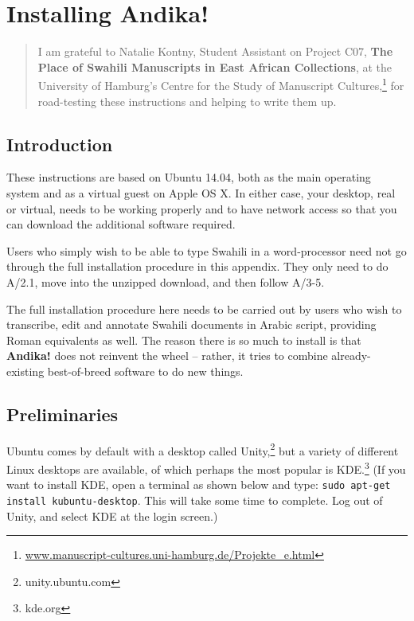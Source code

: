 \chapter{Installing \textbf{Andika!}}
\renewcommand{\thesection}{A/\arabic{section}}  %
\setcounter{section}{0}  %
\label{appA}


\begin{quotation}
\noindent I am grateful to Natalie Kontny, Student Assistant on Project C07, \textbf{The Place of Swahili Manuscripts in East African Collections},  at the University of Hamburg's Centre for the Study of Manuscript Cultures,\footnote{\url{www.manuscript-cultures.uni-hamburg.de/Projekte_e.html}} for road-testing these instructions and helping to write them up.
\end{quotation}

\section{Introduction}

These instructions are based on Ubuntu 14.04, both as the main operating system and as a virtual guest on Apple OS X. In either case, your desktop, real or virtual, needs to be working properly and to have network access so that you can download the additional software required.

Users who simply wish to be able to type Swahili in a word-processor need not go through the full installation procedure in this appendix.  They only need to do A/2.1, move into the unzipped download, and then follow A/3-5.

The full installation procedure here needs to be carried out by users who wish to transcribe, edit and annotate Swahili documents in Arabic script, providing Roman equivalents as well.  The reason there is so much to install is that \textbf{Andika!} does not reinvent the wheel -- rather, it tries to combine already-existing best-of-breed software to do new things.

\section{Preliminaries}

Ubuntu comes by default with a desktop called Unity,\footnote{unity.ubuntu.com} but a variety of different Linux desktops are available, of which perhaps the most popular is KDE.\footnote{kde.org}  (If you want to install KDE, open a terminal as shown below and type: \verb|sudo apt-get install kubuntu-desktop|.  This will take some time to complete.  Log out of Unity, and select KDE at the login screen.)

